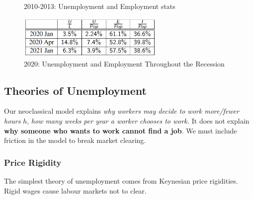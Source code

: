 \documentclass[11pt]{article}
\begin{document}
\begin{figure}[h]
    \centering
    \qquad
    \caption{2010-2013: Unemployment and Employment stats}%
    \label{fig:2010-2013 employment stats}%
\end{figure}

\begin{figure}[h]
    \centering
    \includegraphics[width=7cm]{photos/2020 employmwnt stats.png}
    \caption{2020: Unemployment and Employment Throughout the Recession}
    \label{fig:2020 employment stats}
\end{figure}

\subsection{Theories of Unemployment}

Our neoclassical model explains \textit{why workers may decide to work more/fewer hours} $h$, \textit{how many weeks per year a worker chooses to work.} It does not explain \textbf{why someone who wants to work cannot find a job}. We must include friction in the model to break market clearing.

\subsubsection{Price Rigidity}

The simplest theory of unemployment comes from Keynesian price rigidities. Rigid wages cause labour markets not to clear.
\end{document}

